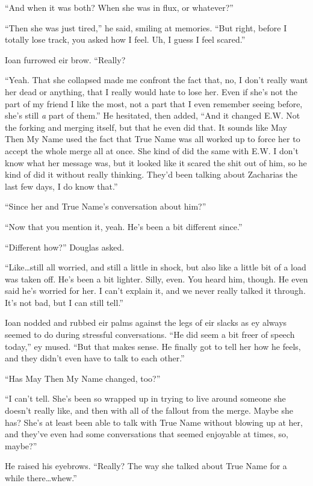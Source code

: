 ``And when it was both? When she was in flux, or whatever?''

``Then she was just tired,'' he said, smiling at memories. ``But right, before I totally lose track, you asked how I feel. Uh, I guess I feel scared.''

Ioan furrowed eir brow. ``Really?

``Yeah. That she collapsed made me confront the fact that, no, I don't really want her dead or anything, that I really would hate to lose her. Even if she's not the part of my friend I like the most, not a part that I even remember seeing before, she's still \emph{a} part of them.'' He hesitated, then added, ``And it changed E.W. Not the forking and merging itself, but that he even did that. It sounds like May Then My Name used the fact that True Name was all worked up to force her to accept the whole merge all at once. She kind of did the same with E.W. I don't know what her message was, but it looked like it scared the shit out of him, so he kind of did it without really thinking. They'd been talking about Zacharias the last few days, I do know that.''

``Since her and True Name's conversation about him?''

``Now that you mention it, yeah. He's been a bit different since.''

``Different how?'' Douglas asked.

``Like\ldots still all worried, and still a little in shock, but also like a little bit of a load was taken off. He's been a bit lighter. Silly, even. You heard him, though. He even said he's worried for her. I can't explain it, and we never really talked it through. It's not bad, but I can still tell.''

Ioan nodded and rubbed eir palms against the legs of eir slacks as ey always seemed to do during stressful conversations. ``He did seem a bit freer of speech today,'' ey mused. ``But that makes sense. He finally got to tell her how he feels, and they didn't even have to talk to each other.''

``Has May Then My Name changed, too?''

``I can't tell. She's been so wrapped up in trying to live around someone she doesn't really like, and then with all of the fallout from the merge. Maybe she has? She's at least been able to talk with True Name without blowing up at her, and they've even had some conversations that seemed enjoyable at times, so, maybe?''

He raised his eyebrows. ``Really? The way she talked about True Name for a while there\ldots whew.''

